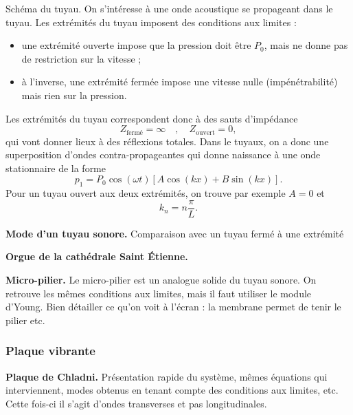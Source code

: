 Schéma du tuyau.
On s'intéresse à une onde acoustique se propageant dans le tuyau.
Les extrémités du tuyau imposent des conditions aux limites :
\begin{itemize}
\item une extrémité ouverte impose que la pression doit être $P_0$, mais ne donne pas de restriction sur la vitesse ;
\item à l'inverse, une extrémité fermée impose une vitesse nulle (impénétrabilité) mais rien sur la pression.
\end{itemize}
Les extrémités du tuyau correspondent donc à des sauts d'impédance
\begin{equation}
Z_\mathrm{fermé} = \infty \quad , \quad Z_\mathrm{ouvert} = 0,
\end{equation}
qui vont donner lieux à des réflexions totales.
Dans le tuyaux, on a donc une superposition d'ondes contra-propageantes qui donne naissance à une onde stationnaire de la forme
\begin{equation}
p_1 = P_0 \cos(\omega t) \left[ A\cos(kx) + B\sin(kx) \right].
\end{equation}
Pour un tuyau ouvert aux deux extrémités, on trouve par exemple $A=0$ et
\begin{equation}
k_n = n\frac{\pi}{L}.
\end{equation}
\begin{slide}
\textbf{Mode d'un tuyau sonore.} Comparaison avec un tuyau fermé à une extrémité
\end{slide}
\begin{slide}
\textbf{Orgue de la cathédrale Saint Étienne.}
\end{slide}
\begin{slide}
\textbf{Micro-pilier.} Le micro-pilier est un analogue solide du tuyau sonore.
On retrouve les mêmes conditions aux limites, mais il faut utiliser le module d'Young.
Bien détailler ce qu'on voit à l'écran : la membrane permet de tenir le pilier etc.
\end{slide}

\subsubsection{Plaque vibrante}

\begin{slide}
\textbf{Plaque de Chladni.}
Présentation rapide du système, mêmes équations qui interviennent, modes obtenus en tenant compte des conditions aux limites, etc.
Cette fois-ci il s'agit d'ondes transverses et pas longitudinales.
\end{slide}

